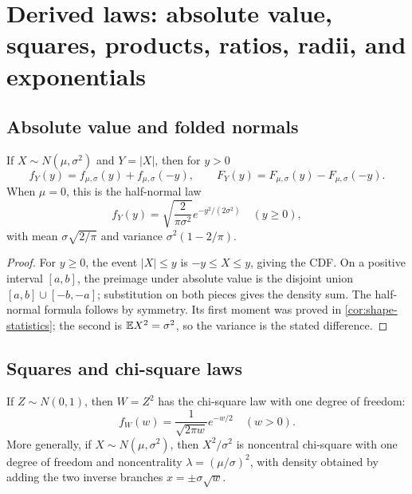 \section{Derived laws: absolute value, squares, products, ratios, radii, and exponentials}\label{sec:derived-laws}

\subsection{Absolute value and folded normals}

\begin{theorem}\label{thm:folded-normal}
If $X\sim N(\mu,\sigma^2)$ and $Y=|X|$, then for $y>0$
\begin{equation}\label{eq:folded-density}
 f_Y(y)=f_{\mu,\sigma}(y)+f_{\mu,\sigma}(-y),
 \qquad
 F_Y(y)=F_{\mu,\sigma}(y)-F_{\mu,\sigma}(-y).
\end{equation}
When $\mu=0$, this is the half-normal law
\begin{equation}\label{eq:half-normal}
 f_Y(y)=\sqrt{\frac2{\pi\sigma^2}}e^{-y^2/(2\sigma^2)}\quad(y\ge0),
\end{equation}
with mean $\sigma\sqrt{2/\pi}$ and variance $\sigma^2(1-2/\pi)$.
\end{theorem}

\begin{proof}
For $y\ge0$, the event $|X|\le y$ is $-y\le X\le y$, giving the CDF.  On a positive interval $[a,b]$, the preimage under absolute value is the disjoint union $[a,b]\cup[-b,-a]$; substitution on both pieces gives the density sum.  The half-normal formula follows by symmetry.  Its first moment was proved in \cref{cor:shape-statistics}; the second is $\mathbb E X^2=\sigma^2$, so the variance is the stated difference.
\end{proof}

\subsection{Squares and chi-square laws}

\begin{theorem}\label{thm:normal-square}
If $Z\sim N(0,1)$, then $W=Z^2$ has the chi-square law with one degree of freedom:
\begin{equation}\label{eq:chi1-density}
 f_W(w)=\frac{1}{\sqrt{2\pi w}}e^{-w/2}\quad(w>0).
\end{equation}
More generally, if $X\sim N(\mu,\sigma^2)$, then $X^2/\sigma^2$ is noncentral chi-square with one degree of freedom and noncentrality $\lambda=(\mu/\sigma)^2$, with density obtained by adding the two inverse branches $x=\pm\sigma\sqrt w$.
\end{theorem}


